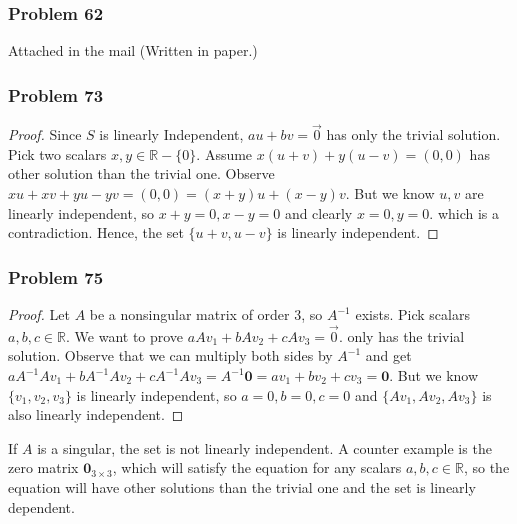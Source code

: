 \documentclass[a4paper,12pt]{article}
\begin{document}
\subsubsection*{Problem 62}
Attached in the mail (Written in paper.)
\subsubsection*{Problem 73}
\begin{proof}
    Since $S$ is linearly Independent, $au+bv=\vec{0}$ has only the trivial solution. Pick two scalars $x,y \in \mathbb{R}-\{0\}.$ Assume $x(u+v)+y(u-v)=(0,0)$ has other solution than the trivial one. Observe $xu+xv+yu-yv=(0,0)=(x+y)u+(x-y)v.$ But we know ${u,v}$ are linearly independent, so $x+y=0, x-y=0$ and clearly $x=0,y=0.$ which is a contradiction. Hence, the set $\{u+v, u-v\}$ is linearly independent.
\end{proof}
\subsubsection*{Problem 75}
\begin{proof}
    Let $A$ be a nonsingular matrix of order 3, so $A^{-1}$ exists. Pick scalars $a,b,c \in \mathbb{R}$. We want to prove $aAv_1+bAv_2+cAv_3=\vec{0}.$ only has the trivial solution. Observe that we can multiply both sides by $A^{-1}$ and get $aA^{-1}Av_1+bA^{-1}Av_2+cA^{-1}Av_3=A^{-1}\textbf{0} = av_1+bv_2+cv_3=\textbf{0}.$ But we know $\{v_1,v_2,v_3\}$ is linearly independent, so $a=0,b=0,c=0$ and $\{Av_1,Av_2,Av_3\}$ is also linearly independent.
\end{proof}
If $A$ is a singular, the set is not linearly independent. A counter example is the zero matrix $\textbf{0}_{3\times 3}$, which will satisfy the equation for any scalars $a,b,c \in \mathbb{R}$, so the equation will have other solutions than the trivial one and the set is linearly dependent.
\end{document}

